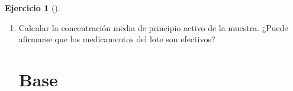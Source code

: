 \documentclass[
  a4paper,
]{scrreport}
\newenvironment{Shaded}{\begin{snugshade}}{\end{snugshade}}
\newcommand{\AttributeTok}[1]{\textcolor[rgb]{0.40,0.45,0.13}{#1}}
\newcommand{\ExtensionTok}[1]{\textcolor[rgb]{0.00,0.23,0.31}{#1}}
\newcommand{\FloatTok}[1]{\textcolor[rgb]{0.68,0.00,0.00}{#1}}
\newcommand{\FunctionTok}[1]{\textcolor[rgb]{0.28,0.35,0.67}{#1}}
\newcommand{\NormalTok}[1]{\textcolor[rgb]{0.00,0.23,0.31}{#1}}
\newcommand{\OtherTok}[1]{\textcolor[rgb]{0.00,0.23,0.31}{#1}}
\theoremstyle{definition}
\newtheorem{exercise}{Ejercicio}[chapter]
\theoremstyle{remark}
\begin{document}
\begin{exercise}[]
\begin{enumerate}
\begin{tcolorbox}
  \section{Tidyverse}

\begin{Shaded}
\begin{Highlighting}[]
\FunctionTok{library}\NormalTok{(tidyverse)}
\NormalTok{df }\OtherTok{\textless{}{-}} \FunctionTok{tibble}\NormalTok{(}\AttributeTok{concentracion =} \FunctionTok{c}\NormalTok{(}\FloatTok{17.6}\NormalTok{, }\FloatTok{19.2}\NormalTok{, }\FloatTok{21.3}\NormalTok{, }\FloatTok{15.1}\NormalTok{, }\FloatTok{17.6}\NormalTok{, }\FloatTok{18.9}\NormalTok{, }\FloatTok{16.2}\NormalTok{, }\FloatTok{18.3}\NormalTok{, }\FloatTok{19.0}\NormalTok{, }\FloatTok{16.4}\NormalTok{ ))}
\end{Highlighting}
\end{Shaded}

  \section{Copilot}

\begin{Shaded}
\begin{Highlighting}[]
\ExtensionTok{El}\NormalTok{ contenido de principio activo de una muestra de medicamentos de un lote es el siguiente: 17.6, 19.2, 21.3, 15.1, 17.6, 18.9, 16.2, 18.3, 19.0, 16.4.}
\ExtensionTok{Crear}\NormalTok{ un data frame de nombre df con una columna de nombre concentración que contenga los datos de esta muestra.}
\end{Highlighting}
\end{Shaded}

  \end{tcolorbox}
\item
  Calcular la concentración media de principio activo de la muestra.
  ¿Puede afirmarse que los medicamentos del lote son efectivos?

  \begin{tcolorbox}[enhanced jigsaw, colframe=quarto-callout-tip-color-frame, toprule=.15mm, bottomtitle=1mm, breakable, opacitybacktitle=0.6, toptitle=1mm, colback=white, bottomrule=.15mm, title=\textcolor{quarto-callout-tip-color}{\faLightbulb}\hspace{0.5em}{Solución}, arc=.35mm, left=2mm, titlerule=0mm, rightrule=.15mm, coltitle=black, leftrule=.75mm, opacityback=0, colbacktitle=quarto-callout-tip-color!10!white]

  \section{Base}


\end{tcolorbox}
\end{enumerate}
\end{exercise}
\end{document}
